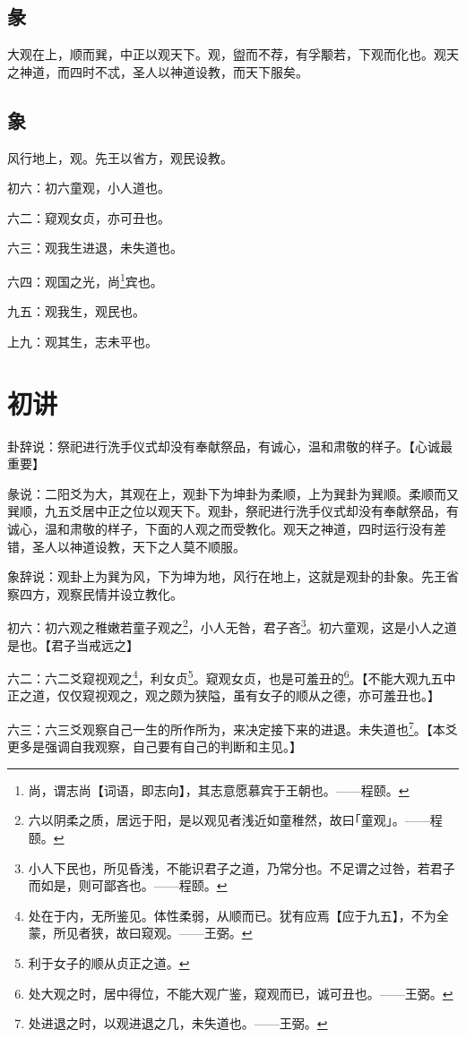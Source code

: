 \documentclass[12pt,oneside]{book}
\begin{document}
\subsection{彖}
大观在上，顺而巽，中正以观天下。观，盥而不荐，有孚颙若，下观而化也。观天之神道，而四时不忒，圣人以神道设教，而天下服矣。

\subsection{象}
风行地上，观。先王以省方，观民设教。

初六：初六童观，小人道也。

六二：窥观女贞，亦可丑也。

六三：观我生进退，未失道也。

六四：观国之光，尚\footnote{尚，谓志尚【词语，即志向】，其志意愿慕宾于王朝也。——程颐。}宾也。

九五：观我生，观民也。

上九：观其生，志未平也。

\section{初讲}
卦辞说：祭祀进行洗手仪式却没有奉献祭品，有诚心，温和肃敬的样子。【心诚最重要】

彖说：二阳爻为大，其观在上，观卦下为坤卦为柔顺，上为巽卦为巽顺。柔顺而又巽顺，九五爻居中正之位以观天下。观卦，祭祀进行洗手仪式却没有奉献祭品，有诚心，温和肃敬的样子，下面的人观之而受教化。观天之神道，四时运行没有差错，圣人以神道设教，天下之人莫不顺服。

象辞说：观卦上为巽为风，下为坤为地，风行在地上，这就是观卦的卦象。先王省察四方，观察民情并设立教化。

初六：初六观之稚嫩若童子观之\footnote{六以阴柔之质，居远于阳，是以观见者浅近如童稚然，故曰｢童观｣。——程颐。}，小人无咎，君子吝\footnote{小人下民也，所见昏浅，不能识君子之道，乃常分也。不足谓之过咎，若君子而如是，则可鄙吝也。——程颐。}。初六童观，这是小人之道是也。【君子当戒远之】

六二：六二爻窥视观之\footnote{处在于内，无所鉴见。体性柔弱，从顺而已。犹有应焉【应于九五】，不为全蒙，所见者狭，故曰窥观。——王弼。}，利女贞\footnote{利于女子的顺从贞正之道。}。窥观女贞，也是可羞丑的\footnote{处大观之时，居中得位，不能大观广鉴，窥观而已，诚可丑也。——王弼。}。【不能大观九五中正之道，仅仅窥视观之，观之颇为狭隘，虽有女子的顺从之德，亦可羞丑也。】

六三：六三爻观察自己一生的所作所为，来决定接下来的进退。未失道也\footnote{处进退之时，以观进退之几，未失道也。——王弼。}。【本爻更多是强调自我观察，自己要有自己的判断和主见。】
\end{document}
